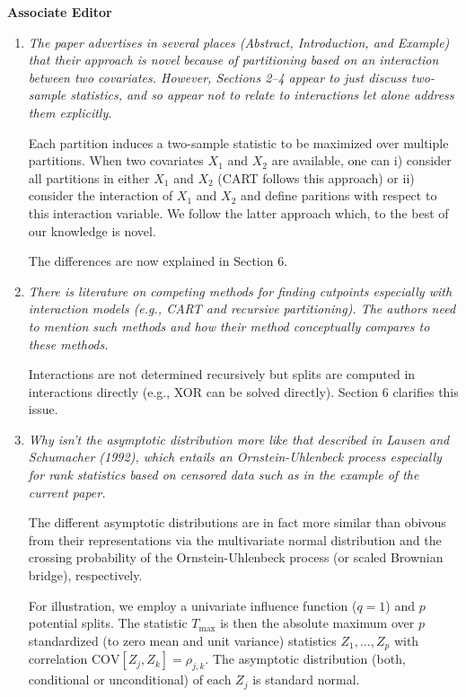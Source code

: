 \documentclass[11pt,a4paper]{article}
\begin{document}
\textbf{\large Associate Editor}

\begin{enumerate}

  \item \textit{The paper advertises in several places (Abstract,
        Introduction, and Example) that their approach is novel because
	of partitioning based on an interaction between two covariates.
	However, Sections 2--4 appear to just discuss two-sample statistics,
	and so appear not to relate to interactions let alone address them
	explicitly.}
	
        Each partition induces a two-sample statistic to be maximized
        over multiple partitions. When two covariates $X_1$ and $X_2$ are available,
        one can i) consider all partitions in either $X_1$ and $X_2$ (CART follows
        this approach) or ii) consider the interaction of $X_1$ and $X_2$ 
        and define paritions with respect to this interaction variable.
        We follow the latter approach which, to the best of our knowledge is novel.

        The differences are now explained in Section 6.
	
  \item \textit{There is literature on competing methods for finding cutpoints
        especially with interaction models (e.g., CART and recursive partitioning).
	The authors need to mention such methods and how their method conceptually
	compares to these methods.}
	
	Interactions are not determined recursively but splits are computed in
	interactions directly (e.g., XOR can be solved directly). Section 6
        clarifies this issue.

  \item \textit{Why isn't the asymptotic distribution more like that described
        in Lausen and Schumacher (1992), which entails an Ornstein-Uhlenbeck process
	especially for rank statistics based on censored data such as in the example
	of the current paper.}
	
        The different asymptotic distributions are in fact more similar than obivous
	from their representations via the multivariate normal distribution and the
	crossing probability of the Ornstein-Uhlenbeck process (or scaled Brownian
	bridge), respectively. 
	
	For illustration, we employ a univariate influence function ($q = 1$) and
	$p$ potential splits. The statistic $T_{\max}$ is then the absolute maximum over
	$p$ standardized (to zero mean and unit variance) statistics $Z_1, \dots, Z_p$
	with correlation $\mbox{COV}[Z_j, Z_k] = \rho_{j, k}$. The asymptotic distribution
	(both, conditional or unconditional) of each $Z_j$ is standard normal.
	

\end{enumerate}
\end{document}

